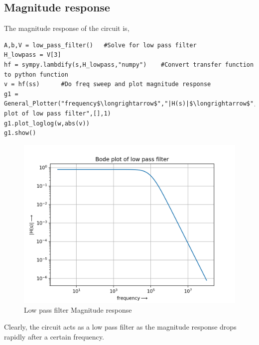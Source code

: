\documentclass[11pt, a4paper]{article}
\begin{document}
\subsection{Magnitude response}
The magnitude response of the circuit is,
\begin{lstlisting}
A,b,V = low_pass_filter()	#Solve for low pass filter
H_lowpass = V[3]
hf = sympy.lambdify(s,H_lowpass,"numpy")	#Convert transfer function to python function
v = hf(ss)		#Do freq sweep and plot magnitude response
g1 = General_Plotter("frequency$\longrightarrow$","|H(s)|$\longrightarrow$","Bode plot of low pass filter",[],1)
g1.plot_loglog(w,abs(v))
g1.show()
\end{lstlisting}
\begin{figure}[!tbh]
   	\centering
   	\includegraphics[scale=0.5]{low_pass_bode.png}   
   	\caption{Low pass filter Magnitude response}
   	\label{fig:Figure_1}
\end{figure}
Clearly, the circuit acts as a low pass filter as the magnitude response drops rapidly after a certain frequency.
\end{document}
